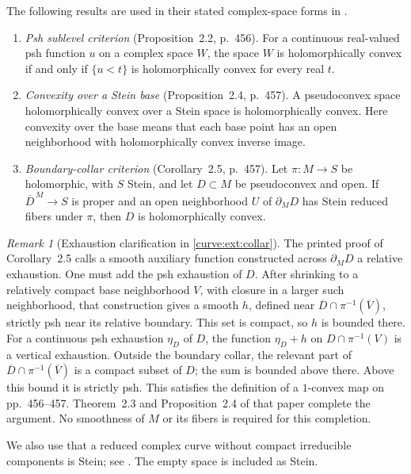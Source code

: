 \documentclass[11pt]{amsart}
\theoremstyle{definition}
\theoremstyle{remark}
\newtheorem{remark}[theorem]{Remark}
\numberwithin{equation}{section}
\begin{document}
The following results are used in their stated complex-space forms
in \cite{VijituForum2022}.
\begin{enumerate}[label=\textup{(V\arabic*)},ref=V\arabic*,leftmargin=*]
\item\label{curve:ext:sublevels}
\emph{Psh sublevel criterion} (Proposition~2.2, p.~456).
For a continuous real-valued psh function \(u\) on a complex space \(W\),
the space \(W\) is holomorphically convex if and only if
\(\{u<t\}\) is holomorphically convex for every real \(t\).
\item\label{curve:ext:localglobal}
\emph{Convexity over a Stein base} (Proposition~2.4, p.~457).
A pseudoconvex space holomorphically convex over a Stein space is
holomorphically convex. Here convexity over the base means that each
base point has an open neighborhood with holomorphically convex
inverse image.
\item\label{curve:ext:collar}
\emph{Boundary-collar criterion} (Corollary~2.5, p.~457).
Let \(\pi:M\to S\) be holomorphic, with \(S\) Stein, and let
\(D\subset M\) be pseudoconvex and open.
If \(\overline D^{\,M}\to S\) is proper and an open neighborhood
\(U\) of \(\partial_M D\) has Stein reduced fibers under \(\pi\),
then \(D\) is holomorphically convex.
\end{enumerate}

\begin{remark}[Exhaustion clarification in \ref{curve:ext:collar}]
The printed proof of Corollary~2.5 calls a smooth auxiliary function
constructed across \(\partial_M D\) a relative exhaustion.
One must add the psh exhaustion of \(D\).
After shrinking to a relatively compact base neighborhood \(V\),
with closure in a larger such neighborhood, that construction gives
a smooth \(h\), defined near
\(\overline D\cap\pi^{-1}(\overline V)\), strictly psh near its
relative boundary. This set is compact, so \(h\) is bounded there.
For a continuous psh exhaustion \(\eta_D\) of \(D\), the function
\(\eta_D+h\) on \(D\cap\pi^{-1}(V)\) is a vertical exhaustion.
Outside the boundary collar, the relevant part of
\(\overline D\cap\pi^{-1}(\overline V)\) is a compact subset of \(D\);
the sum is bounded above there. Above this bound it is strictly psh.
This satisfies the definition of a \(1\)-convex map on pp.~456--457.
Theorem~2.3 and Proposition~2.4 of that paper complete the argument.
No smoothness of \(M\) or its fibers is required for this completion.
\end{remark}

We also use that a reduced complex curve without compact irreducible
components is Stein; see \cite[\S3, p.~1663]{Vajaitu2022}.
The empty space is included as Stein.
\end{document}
